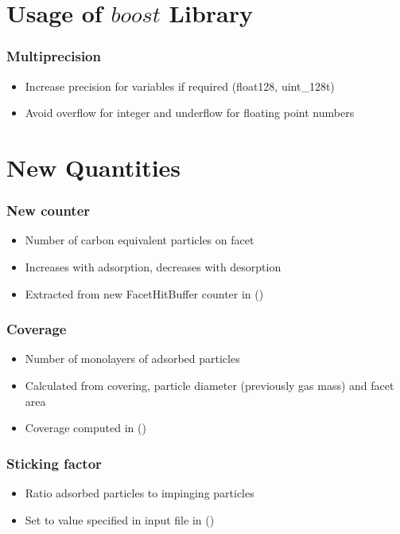 \section{Usage of $boost$ Library}
\subsubsection{Multiprecision}
\begin{itemize}[noitemsep,topsep=0pt, partopsep=0pt]
\item Increase precision for variables if required (float128, uint\_128t)
\item Avoid overflow for integer and underflow for floating point numbers
\end{itemize}
\newpage
\section{New Quantities}
\label{sub:quant}
\subsubsection{New counter }
\begin{itemize}[noitemsep,topsep=0pt, partopsep=0pt]
\item Number of carbon equivalent particles on facet
\item Increases with adsorption, decreases with desorption
\item Extracted from new FacetHitBuffer counter in  ()
\end{itemize}

\subsubsection{Coverage}
\begin{itemize}[noitemsep,topsep=0pt, partopsep=0pt]
\item Number of monolayers of adsorbed particles
\item Calculated from covering, particle diameter (previously gas mass) and facet area
\item Coverage computed in  ()
\end{itemize}

\subsubsection{Sticking factor}
\begin{itemize}[noitemsep,topsep=0pt, partopsep=0pt]
\item Ratio adsorbed particles to impinging particles
\item Set to value specified in input file in  ()
\end{itemize}

